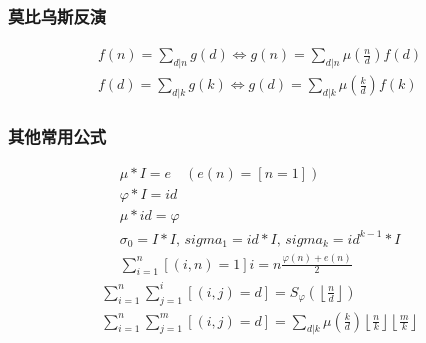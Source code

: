 \subsubsection{莫比乌斯反演}
	$$ \begin{aligned}
		f(n) = \sum_{d | n} g(d) \Leftrightarrow g(n) = \sum_{d | n} \mu\left( \frac n d \right) f(d) \\
		f(d) = \sum_{d | k} g(k) \Leftrightarrow g(d) = \sum_{d | k} \mu\left( \frac k d \right) f(k)
	\end{aligned} $$

\subsubsection{其他常用公式}
	$$ \begin{aligned}
		\mu * I = e \quad (e(n) = [n = 1]) \\
		\varphi * I = id \\
		\mu * id = \varphi \\
		\sigma_0 = I * I ,\, sigma_1 = id * I ,\, sigma_k = id^{k - 1} * I \\
		\sum_{i = 1} ^ n \left[(i, n) = 1\right] i = n \frac {\varphi(n) + e(n)} 2
	\end{aligned} $$
	$$ \begin{aligned}
		\sum_{i = 1} ^ n \sum_{j = 1} ^ i \left[(i, j) = d\right] = S_\varphi \left( \left\lfloor \frac n d \right\rfloor \right) \\
		\sum_{i = 1} ^ n \sum_{j = 1} ^ m \left[(i, j) = d\right] = \sum_{d | k} \mu\left( \frac k d \right) \left\lfloor \frac n k \right\rfloor \left\lfloor \frac m k \right\rfloor
	\end{aligned} $$